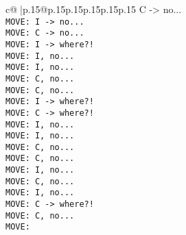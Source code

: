 \documentclass{article}
\begin{document}
{\begin{supertabular}{c@{$\;$}|p{.15\linewidth}@{}p{.15\linewidth}p{.15\linewidth}p{.15\linewidth}p{.15\linewidth}p{.15\linewidth}}
{{{ C -> no...\\ \tt  MOVE: I -> no...\\ \tt  MOVE: C -> no...\\ \tt  MOVE: I -> where?!\\ \tt  MOVE: I, no...\\ \tt  MOVE: I, no...\\ \tt  MOVE: C, no...\\ \tt  MOVE: C, no...\\ \tt  MOVE: I -> where?!\\ \tt  MOVE: C -> where?!\\ \tt  MOVE: I, no...\\ \tt  MOVE: I, no...\\ \tt  MOVE: C, no...\\ \tt  MOVE: C, no...\\ \tt  MOVE: I, no...\\ \tt  MOVE: C, no...\\ \tt  MOVE: I, no...\\ \tt  MOVE: C -> where?!\\ \tt  MOVE: C, no...\\ \tt  MOVE: }}}
\end{supertabular}}
\end{document}

